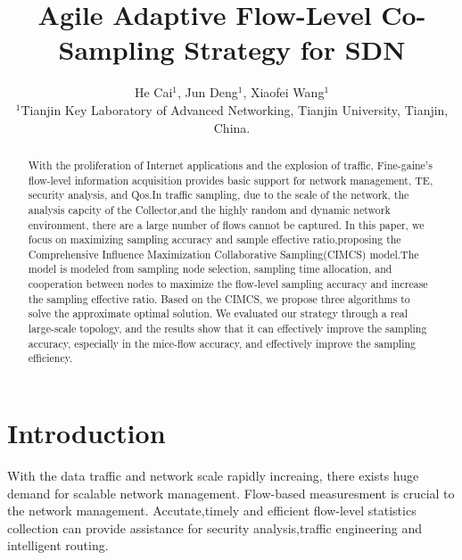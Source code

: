 \documentclass[conference]{IEEEtran}
\begin{document}
\title{ Agile Adaptive Flow-Level Co-Sampling Strategy for SDN}

\author{He Cai$^{1}$, Jun Deng$^{1}$, Xiaofei Wang$^{1}$
\\
${^1}$Tianjin Key Laboratory of Advanced Networking, %
Tianjin University, Tianjin, China.
}


\maketitle

\begin{abstract}
With the proliferation of Internet applications and the explosion of traffic, Fine-gaine's flow-level information acquisition provides basic support for network management, TE, security analysis, and Qos.In traffic sampling, due to the scale of the network, the analysis capcity of the Collector,and the highly random and dynamic network environment, there are a large number of flows cannot be captured. In this paper, we focus on maximizing sampling accuracy and sample effective ratio,proposing the Comprehensive Influence Maximization Collaborative Sampling(CIMCS) model.The model is modeled from sampling node selection, sampling time allocation, and cooperation between nodes to maximize the flow-level sampling accuracy and increase the sampling effective ratio. Based on the CIMCS, we propose three algorithms to solve the approximate optimal solution. We evaluated our strategy through a real large-scale topology, and the results show that it can effectively improve the sampling accuracy, especially in the mice-flow accuracy, and effectively improve the sampling efficiency.
\end{abstract}
\IEEEpeerreviewmaketitle

\section{Introduction}

With the data traffic and network scale rapidly increaing, there exists huge demand for scalable network management. Flow-based measuresment is crucial to the network management. Accutate,timely and efficient flow-level statistics collection can provide assistance for security analysis,traffic engineering and intelligent routing. 
\end{document}
